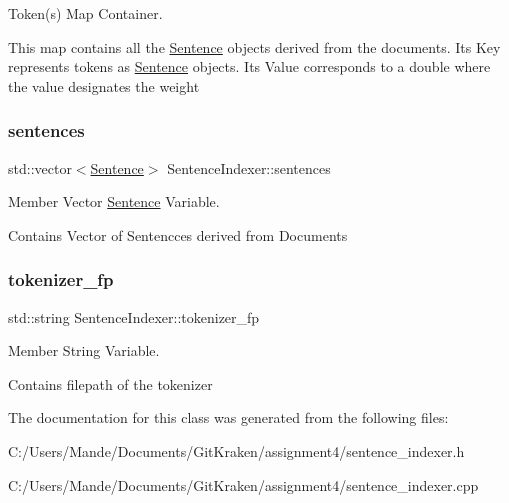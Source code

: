 Token(s) Map Container. 

This map contains all the \hyperlink{class_sentence}{Sentence} objects derived from the documents. It\textquotesingle{}s Key represents tokens as \hyperlink{class_sentence}{Sentence} objects. It\textquotesingle{}s Value corresponds to a double where the value designates the weight \mbox{\label{class_sentence_indexer_a3c6b2408388e17f3b43ec9fec36f2628}} 
\subsubsection{\texorpdfstring{sentences}{sentences}}
{\footnotesize\ttfamily std\+::vector$<$\hyperlink{class_sentence}{Sentence}$>$ Sentence\+Indexer\+::sentences\hspace{0.3cm}{\ttfamily [private]}}



Member Vector \hyperlink{class_sentence}{Sentence} Variable. 

Contains Vector of Sentencces derived from Documents \mbox{\label{class_sentence_indexer_a6f6dd24962085f59f1a87e2c21edb58f}} 
\subsubsection{\texorpdfstring{tokenizer\+\_\+fp}{tokenizer\_fp}}
{\footnotesize\ttfamily std\+::string Sentence\+Indexer\+::tokenizer\+\_\+fp\hspace{0.3cm}{\ttfamily [private]}}



Member String Variable. 

Contains filepath of the tokenizer 

The documentation for this class was generated from the following files\+:\begin{DoxyCompactItemize}
\item 
C\+:/\+Users/\+Mande/\+Documents/\+Git\+Kraken/assignment4/sentence\+\_\+indexer.\+h\item 
C\+:/\+Users/\+Mande/\+Documents/\+Git\+Kraken/assignment4/sentence\+\_\+indexer.\+cpp\end{DoxyCompactItemize}
